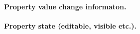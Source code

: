   \paragraph*{Property value change informaton.}
  \paragraph*{Property state (editable, visible etc.).}


% 
% 
% 
% 

